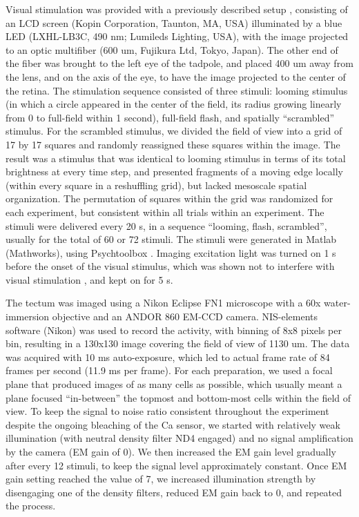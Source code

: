 \documentclass{article}
\begin{document}
Visual stimulation was provided with a previously described setup \citep{khakhalin2014}, consisting of an LCD screen (Kopin Corporation, Taunton, MA, USA) illuminated by a blue LED (LXHL-LB3C, 490 nm; Lumileds Lighting, USA), with the image projected to an optic multifiber (600 um, Fujikura Ltd, Tokyo, Japan). The other end of the fiber was brought to the left eye of the tadpole, and placed 400 um away from the lens, and on the axis of the eye, to have the image projected to the center of the retina. The stimulation sequence consisted of three stimuli: looming stimulus (in which a circle appeared in the center of the field, its radius growing linearly from 0 to full-field within 1 second), full-field flash, and spatially “scrambled” stimulus. For the scrambled stimulus, we divided the field of view into a grid of 17 by 17 squares and randomly reassigned these squares within the image. The result was a stimulus that was identical to looming stimulus in terms of its total brightness at every time step, and presented fragments of a moving edge locally (within every square in a reshuffling grid), but lacked mesoscale spatial organization. The permutation of squares within the grid was randomized for each experiment, but consistent within all trials within an experiment. The stimuli were delivered every 20 s, in a sequence “looming, flash, scrambled”, usually for the total of 60 or 72 stimuli. The stimuli were generated in Matlab (Mathworks), using Psychtoolbox \citep{kleiner2007psychtoolbox}. Imaging excitation light was turned on 1 s before the onset of the visual stimulus, which was shown not to interfere with visual stimulation \citep{xu2011}, and kept on for 5 s.

The tectum was imaged using a Nikon Eclipse FN1 microscope with a 60x water-immersion objective and an ANDOR 860 EM-CCD camera. NIS-elements software (Nikon) was used to record the activity, with binning of 8x8 pixels per bin, resulting in a 130x130 image covering the field of view of 1130 um. The data was acquired with 10 ms auto-exposure, which led to actual frame rate of 84 frames per second (11.9 ms per frame). For each preparation, we used a focal plane that produced images of as many cells as possible, which usually meant a plane focused “in-between” the topmost and bottom-most cells within the field of view. To keep the signal to noise ratio consistent throughout the experiment despite the ongoing bleaching of the Ca sensor, we started with relatively weak illumination (with neutral density filter ND4 engaged) and no signal amplification by the camera (EM gain of 0). We then increased the EM gain level gradually after every 12 stimuli, to keep the signal level approximately constant. Once EM gain setting reached the value of 7, we increased illumination strength by disengaging one of the density filters, reduced EM gain back to 0, and repeated the process.
\end{document}
